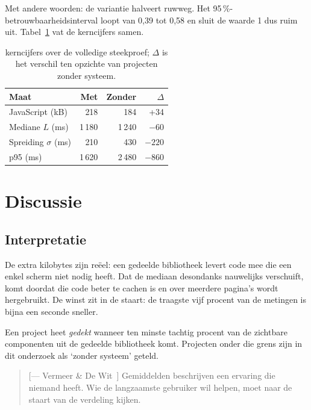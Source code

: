 \documentclass[11pt,a4paper]{article}
\begin{document}
Met andere woorden: de variantie halveert ruwweg. Het 95\,\%-betrouwbaarheidsinterval loopt van 0,39 tot 0,58 en sluit de waarde 1 dus ruim uit. Tabel~\ref{tab:kerncijfers} vat de kerncijfers samen.

\begin{table}
\caption{kerncijfers over de volledige steekproef; $\Delta$ is het verschil ten opzichte van projecten zonder systeem.}
\label{tab:kerncijfers}
\begin{tabular}{lrrr}
\toprule
Maat & Met & Zonder & $\Delta$ \\
\midrule
JavaScript (kB) & 218 & 184 & +34 \\
Mediane $L$ (ms) & 1\,180 & 1\,240 & $-60$ \\
Spreiding $\sigma$ (ms) & 210 & 430 & $-220$ \\
p95 (ms) & 1\,620 & 2\,480 & $-860$ \\
\bottomrule
\end{tabular}
\end{table}

\clearpage

\section{Discussie}
\label{sec:discussie}

\subsection{Interpretatie}

De extra kilobytes zijn reëel: een gedeelde bibliotheek levert code mee die een enkel scherm niet nodig heeft. Dat de mediaan desondanks nauwelijks verschuift, komt doordat die code beter te cachen is en over meerdere pagina's wordt hergebruikt. De winst zit in de staart: de traagste vijf procent van de metingen is bijna een seconde sneller.

\begin{definition}[Dekking]
\label{def:dekking}
Een project heet \emph{gedekt} wanneer ten minste tachtig procent van de zichtbare componenten uit de gedeelde bibliotheek komt. Projecten onder die grens zijn in dit onderzoek als `zonder systeem' geteld.
\end{definition}

\begin{quote}[--- Vermeer \& De Wit~\cite[p.~212]{vermeer23}]
Gemiddelden beschrijven een ervaring die niemand heeft. Wie de langzaamste gebruiker wil helpen, moet naar de staart van de verdeling kijken.
\end{quote}
\end{document}
